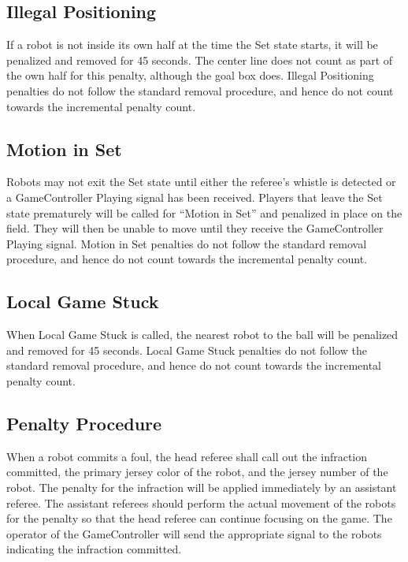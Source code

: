 \documentclass[12pt]{article}
\begin{document}
\subsection{Illegal Positioning}
\label{sec:illegal_positioning}

If a robot is not inside its own half at the time the Set state starts, it will be penalized and removed for 45 seconds. The center line does not count as part of the own half for this penalty, although the goal box does. Illegal Positioning penalties do not follow the standard removal procedure, and hence do not count towards the incremental penalty count.

\subsection{Motion in Set}
\label{sec:motion_in_set}

Robots may not exit the Set state until either the referee's whistle is detected or a GameController Playing signal has been received.  Players that leave the Set state prematurely will be called for ``Motion in Set'' and penalized in place on the field.  They will then be unable to move until they receive the GameController Playing signal.  Motion in Set penalties do not follow the standard removal procedure, and hence do not count towards the incremental penalty count.

\subsection{Local Game Stuck}
\label{sec:pen_local_game_stuck}

When Local Game Stuck is called, the nearest robot to the ball will be penalized and removed for 45 seconds. Local Game Stuck penalties do not follow the standard removal procedure, and hence do not count towards the incremental penalty count.

\subsection{Penalty Procedure}
\label{sec:penalty_procedure}

When a robot commits a foul, the head referee shall call out the infraction committed, the primary jersey color of the robot, and the jersey number of the robot. The penalty for the infraction will be applied immediately by an assistant referee. The assistant referees should perform the actual movement of the robots for the penalty so that the head referee can continue focusing on the game. The operator of the GameController will send the appropriate signal to the robots indicating the infraction committed.
\end{document}
